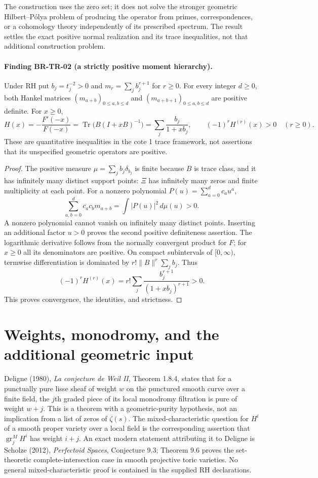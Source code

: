 \documentclass[11pt,a4paper]{article}
\theoremstyle{definition}\newtheorem{definition}[theorem]{Definition}
\theoremstyle{remark}\newtheorem{remark}[theorem]{Remark}
\begin{document}
The construction uses the zero set; it does not solve the stronger
geometric Hilbert--P\'olya problem of producing the operator from
primes, correspondences, or a cohomology theory independently of its
prescribed spectrum.  The result settles the exact positive normal
realization and its trace inequalities, not that additional
construction problem.

\paragraph{Finding BR-TR-02 (a strictly positive moment hierarchy).}
Under RH put $b_j=t_j^{-2}>0$ and
$m_r=\sum_j b_j^{r+1}$ for $r\geq0$.  For every integer $d\geq0$,
both Hankel matrices $(m_{a+b})_{0\leq a,b\leq d}$ and
$(m_{a+b+1})_{0\leq a,b\leq d}$ are positive definite.
For $x\geq0$,
\[
 H(x)=-\frac{F'(-x)}{F(-x)}
      =\operatorname{Tr}\bigl(B(I+xB)^{-1}\bigr)
      =\sum_j\frac{b_j}{1+xb_j},
 \qquad (-1)^r H^{(r)}(x)>0\quad(r\geq0).
\]
These are quantitative inequalities in the cote 1 trace framework,
not assertions that its unspecified geometric operators are positive.

\begin{proof}
The positive measure $\mu=\sum_jb_j\delta_{b_j}$ is finite because
$B$ is trace class, and it has infinitely many distinct support points:
$\Xi$ has infinitely many zeros and finite multiplicity at each point.
For a nonzero polynomial $P(u)=\sum_{a=0}^d c_au^a$,
\[
 \sum_{a,b=0}^d\overline{c_a}c_bm_{a+b}
   =\int |P(u)|^2\,d\mu(u)>0.
\]
A nonzero polynomial cannot vanish on infinitely many distinct points.
Inserting an additional factor $u>0$ proves the second positive
definiteness assertion.  The logarithmic derivative follows from
the normally convergent product for $F$; for $x\geq0$ all its
denominators are positive.  On compact subintervals of $[0,\infty)$,
termwise differentiation is dominated by
$r!\|B\|^r\sum_jb_j$.  Thus
\[
 (-1)^rH^{(r)}(x)
 =r!\sum_j\frac{b_j^{r+1}}{(1+xb_j)^{r+1}}>0.
\]
This proves convergence, the identities, and strictness.
\end{proof}

\section{Weights, monodromy, and the additional geometric input}
\label{sec:root-weights}

Deligne (1980), \emph{La conjecture de Weil II}, Theorem 1.8.4,
states that for a punctually pure lisse sheaf of weight $w$ on the
punctured smooth curve over a finite field, the $j$th graded piece
of its local monodromy filtration is pure of weight $w+j$.
This is a theorem with a geometric-purity hypothesis, not an
implication from a list of zeros of $\zeta(s)$.
The mixed-characteristic question for $H^i$ of a smooth proper
variety over a local field is the corresponding assertion that
$\operatorname{gr}_j^M H^i$ has weight $i+j$.
An exact modern statement attributing it to Deligne is Scholze (2012),
\emph{Perfectoid Spaces}, Conjecture 9.3; Theorem 9.6 proves the
set-theoretic complete-intersection case in smooth projective toric
varieties.  No general mixed-characteristic proof is contained in
the supplied RH declarations.
\end{document}
